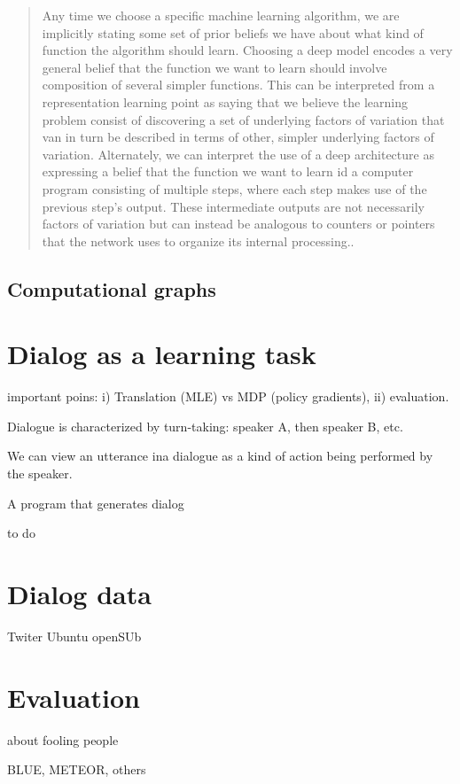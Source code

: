 \begin{quote}
Any time we choose a specific machine learning algorithm, we are implicitly stating some set of prior beliefs we have about what kind of function the algorithm should learn. Choosing a deep model encodes a very general belief that the function we want to learn should involve composition of several simpler functions. This can be interpreted from a representation learning point as saying that we believe the learning problem consist of discovering a set of underlying factors of variation that van in turn be described in terms of other, simpler underlying factors of variation. Alternately, we can interpret  the use of a deep architecture as expressing a belief that the function we want to learn id a computer program consisting of multiple steps, where each step makes use of the previous step's output. These intermediate outputs are not necessarily factors of variation but can instead be analogous to counters or pointers that the network uses to organize its internal processing.\cite[p.~195]{DeepLearningbook}.
\end{quote}


\subsection{Computational graphs}


\section{Dialog as a learning task}

important poins: i) Translation (MLE) vs MDP (policy gradients), ii) evaluation.

Dialogue is characterized by turn-taking: speaker A, then speaker B, etc.

We can view an utterance ina dialogue as a kind of action being performed by the speaker.

A program that generates dialog

to do 

\section{Dialog data}

Twiter Ubuntu openSUb

\section{Evaluation}

about fooling people 


BLUE, METEOR, others 
